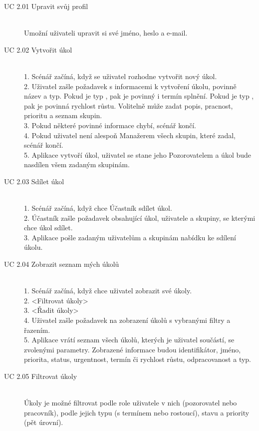 \documentclass[thesis=B,czech]{FITthesis}[2012/06/26]
\begin{document}
			\begin{description}
				\item[UC 2.01 Upravit svůj profil] \hfill \\
					Umožní uživateli upravit si své jméno, heslo a e-mail.
				
				\item[UC 2.02 Vytvořit úkol] \hfill \\
					1. Scénář začíná, když se uživatel rozhodne vytvořit nový úkol. \\
					2. Uživatel zašle požadavek s informacemi k vytvoření úkolu, povinně název a typ. Pokud je typ ,  pak je povinný i termín splnění. Pokud je typ , pak je povinná rychlost růstu. Volitelně může zadat popis, pracnost, prioritu a seznam skupin. \\
					3. Pokud některé povinné informace chybí, scénář končí. \\
					4. Pokud uživatel není alespoň Manažerem všech skupin, které zadal, scénář končí. \\
					5. Aplikace vytvoří úkol, uživatel se stane jeho Pozorovatelem a úkol bude nasdílen všem zadaným skupinám. \\
				
				\item[UC 2.03 Sdílet úkol] \hfill \\
					1. Scénář začíná, když chce Účastník sdílet úkol. \\
					2. Účastník zašle požadavek obsahující úkol, uživatele a skupiny, se kterými chce úkol sdílet. \\
					3. Aplikace pošle zadaným uživatelům a skupinám nabídku ke sdílení úkolu.
				
				\item[UC 2.04 Zobrazit seznam mých úkolů] \hfill \\
					1. Scénář začíná, když chce uživatel zobrazit své úkoly.\\
				    2. <Filtrovat úkoly> \\
				    3. <Řadit úkoly> \\
				    4. Uživatel zašle požadavek na zobrazení úkolů s vybranými filtry a řazením.\\
					5. Aplikace vrátí seznam všech úkolů, kterých je uživatel součástí, se zvolenými parametry. Zobrazené informace budou identifikátor, jméno, priorita, status, urgentnost, termín či rychlost růstu, odpracovanost a typ. \\
					
				\item[UC 2.05 Filtrovat úkoly] \hfill \\
					Úkoly je možné filtrovat podle role uživatele v nich (pozorovatel nebo pracovník), podle jejich typu (s termínem nebo rostoucí), stavu a priority (pět úrovní).
					

\end{description}
\end{document}
